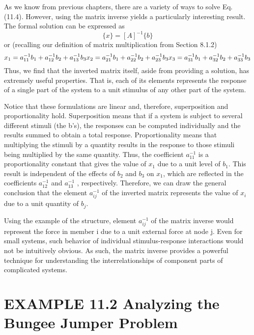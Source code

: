 \documentclass[../main.tex]{subfiles}
\begin{document}
As we know from previous chapters, there are a variety of ways to solve Eq. (11.4).
However, using the matrix inverse yields a particularly interesting result. The formal solution can be expressed as
\begin{equation}
\{x\} = [A]^{-1}\{b\}
\end{equation}
or (recalling our definition of matrix multiplication from Section 8.1.2)
\begin{equation}
x_{1} = a_{11}^{-1} b_{1} + a_{12}^{-1} b_{2} + a_{13}^{-1} b_{3}\\
x_{2} = a_{21}^{-1} b_{1} + a_{22}^{-1} b_{2} + a_{23}^{-1} b_{3}\\
x_{3} = a_{31}^{-1} b_{1} + a_{32}^{-1} b_{2} + a_{33}^{-1} b_{3}
\end{equation}
Thus, we find that the inverted matrix itself, aside from providing a solution, has extremely useful properties. That is, each of its elements represents the response of a single part of the system to a unit stimulus of any other part of the system.

Notice that these formulations are linear and, therefore, superposition and proportionality hold. Superposition means that if a system is subject to several different stimuli (the b's), the responses can be computed individually and the results summed to obtain a total response. Proportionality means that multiplying the stimuli by a quantity results in the response to those stimuli being multiplied by the same quantity. Thus, the coefficient $a_{11}^{-1}$ is a proportionality constant that gives the value of $x_{1}$ due to a unit level of $b_{1}$. This result is independent of the effects of $b_{2}$ and $b_{3}$ on $x_{1}$, which are reflected in the coefficients
$a_{12}^{-1}$ and $a_{13}^{-1}$ , respectively. Therefore, we can draw the general conclusion that the element $a_{ij}^{-1}$ of the inverted matrix represents the value of $x_{i}$ due to a unit quantity of $b_{j}$.

Using the example of the structure, element $a_{ij}^{-1}$ of the matrix inverse would represent the force in member i due to a unit external force at node j. Even for small systems, such behavior of individual stimulus-response interactions would not be intuitively obvious. As such, the matrix inverse provides a powerful technique for understanding the interrelationships of component parts of complicated systems.

\section*{EXAMPLE 11.2 Analyzing the Bungee Jumper Problem}
\end{document}

